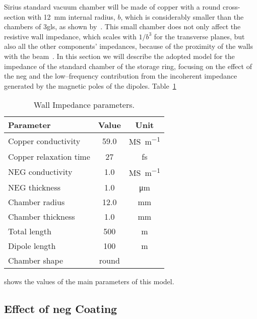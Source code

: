     Sirius standard vacuum chamber will be made of copper with a round cross-section with \SI{12}{\milli\meter} internal radius, $b$, which is considerably smaller than the chambers of \gls{3gls}, as shown by~.
    This small chamber does not only affect the resistive wall impedance, which scales with $1/b^3$ for the transverse planes, but also all the other components' impedances, because of the proximity of the walls with the beam~\cite{Nagaoka2014}.
    In this section we will describe the adopted model for the impedance of the standard chamber of the storage ring, focusing on the effect of the \gls{neg} and the low--frequency contribution from the  incoherent impedance generated by the magnetic poles of the dipoles. Table~\ref{tab:wall_impedance_parameters}
    \begin{table}
        \centering
        \caption{Wall Impedance parameters.}
        \label{tab:wall_impedance_parameters}
        \begin{tabular}{lcc}
            \toprule
            Parameter              &   Value    & Unit \\
            \midrule
            Copper conductivity    &   59.0     & \si{\mega\siemens\per\meter}\\
            Copper relaxation time &   27       & \si{\femto\second}\\
            NEG conductivity       &   1.0      & \si{\mega\siemens\per\meter}\\
            NEG thickness          &   1.0      & \si{\micro\meter}\\
            Chamber radius         &  12.0      & \si{\milli\meter}\\
            Chamber thickness      &   1.0      & \si{\milli\meter}\\
            Total length           &  500       & \si{\meter}\\
            Dipole length          &  100       & \si{\meter}\\
            Chamber shape          & round      & \\
            \bottomrule
        \end{tabular}
    \end{table}
    shows the values of the main parameters of this model.

\subsection{Effect of \gls{neg} Coating}

